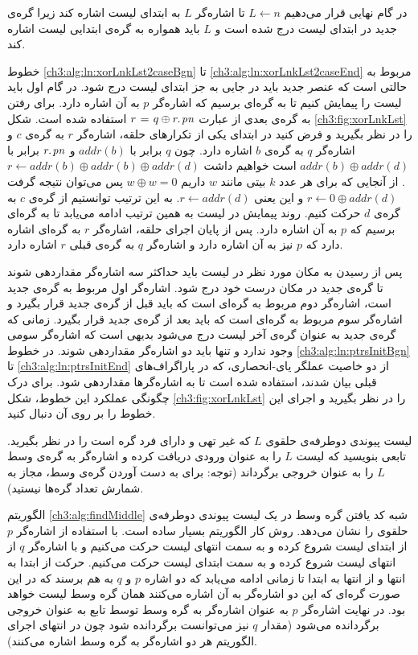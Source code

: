 در گام نهایی قرار می‌دهیم {$L\gets n$} تا اشاره‌گر {$L$} به ابتدای لیست اشاره کند زیرا گره‌ی جدید در ابتدای لیست درج شده است و {$L$} باید همواره به گره‌ی ابتدایی لیست اشاره کند.

خطوط {\ref{ch3:alg:ln:xorLnkLst2caseBgn}} تا {\ref{ch3:alg:ln:xorLnkLst2caseEnd}} مربوط به حالتی است که عنصر جدید باید در جایی به جز ابتدای لیست درج شود. در گام اول باید لیست را پیمایش کنیم تا به گره‌ای برسیم که اشاره‌گر {$p$} به آن اشاره دارد. برای رفتن به گره‌ی بعدی از عبارت {$r \mathrel{\hspace{1pt}=\hspace{1pt}} q \oplus r.\hspace*{1pt}\mathit{pn}$} استفاده شده است. شکل {\eqref{ch3:fig:xorLnkLst}} را در نظر بگیرید و فرض کنید در ابتدای یکی از تکرارهای حلقه، اشاره‌گر {$r$} به گره‌ی {$c$} و اشاره‌گر {$q$} به گره‌ی {$b$} اشاره دارد. چون {$q$} برابر با {$\mathit{addr}(b)$} و {$r.\hspace*{1pt}\mathit{pn}$} برابر با {$\mathit{addr}(b)\oplus \mathit{addr}(d)$} است خواهیم داشت
 {$r\gets\mathit{addr}(b)\oplus\mathit{addr}(b)\oplus\mathit{addr}(d)$}. از آنجایی که برای هر عدد {$k$} بیتی مانند {$w$} داریم {$w\oplus w=0$} پس می‌توان نتیجه گرفت {$r\gets 0\oplus \mathit{addr}(d)$} و این یعنی {$r\gets \mathit{addr}(d)$}. به این ترتیب توانستیم از گره‌ی {$c$} به گره‌ی {$d$} حرکت کنیم. روند پیمایش در لیست به همین ترتیب ادامه می‌یابد تا به گره‌ای برسیم که {$p$} به آن اشاره دارد. پس از پایان اجرای حلقه، اشاره‌گر {$r$} به گره‌ای اشاره دارد که {$p$} نیز به آن اشاره دارد و اشاره‌گر {$q$} به گره‌ی قبلی {$r$} اشاره دارد.

پس از رسیدن به مکان مورد نظر در لیست باید حداکثر سه اشاره‌گر مقداردهی شوند تا گره‌ی جدید در مکان درست خود درج شود. اشاره‌گر اول مربوط به گره‌ی جدید است، اشاره‌گر دوم مربوط به گره‌ای است که باید قبل از گره‌ی جدید قرار بگیرد و اشاره‌گر سوم مربوط به گره‌ای است که باید بعد از گره‌ی جدید قرار بگیرد. زمانی که گره‌ی جدید به عنوان گره‌ی آخر لیست درج می‌شود بدیهی است که اشاره‌گر سومی وجود ندارد و تنها باید دو اشاره‌گر مقداردهی شوند. در خطوط {\ref{ch3:alg:ln:ptrsInitBgn}} تا {\ref{ch3:alg:ln:ptrsInitEnd}} از دو خاصیت عملگر یای-انحصاری، که در پاراگراف‌های قبلی بیان شدند، استفاده شده است تا به اشاره‌گر‌ها مقداردهی شود. برای درک چگونگی عملکرد این خطوط، شکل {\eqref{ch3:fig:xorLnkLst}} را در نظر بگیرید و اجرای این خطوط را بر روی آن دنبال کنید.

 لیست پیوندی دوطرفه‌ی حلقوی {$L$} که غیر تهی و دارای فرد گره است را در نظر بگیرید. تابعی بنویسید که لیست {$L$} را به عنوان ورودی دریافت کرده و اشاره‌گر به گره‌ی وسط {$L$} را به عنوان خروجی برگرداند (توجه: برای به دست آوردن گره‌ی وسط، مجاز به شمارش تعداد گره‌ها نیستید). 


الگوریتم {\eqref{ch3:alg:findMiddle}} شبه کد یافتن گره وسط در یک لیست پیوندی دوطرفه‌ی حلقوی را نشان می‌دهد. روش کار الگوریتم بسیار ساده است. با استفاده از اشاره‌گر {$p$} از ابتدای لیست شروع کرده و به سمت انتهای لیست حرکت می‌کنیم و با اشاره‌گر {$q$} از انتهای لیست شروع کرده و به سمت ابتدای لیست حرکت می‌کنیم. حرکت از ابتدا به انتها و از انتها به ابتدا تا زمانی ادامه می‌یابد که دو اشاره {$p$} و {$q$} به هم برسند که در این صورت گره‌ای که این دو اشاره‌گر به آن اشاره می‌کنند همان گره وسط لیست خواهد بود. در نهایت اشاره‌گر {$p$} به عنوان اشاره‌گر به گره وسط توسط تابع به عنوان خروجی برگردانده می‌شود (مقدار {$q$} نیز می‌توانست برگردانده شود چون در انتهای اجرای الگوریتم هر دو اشاره‌گر به گره وسط اشاره می‌کنند).

